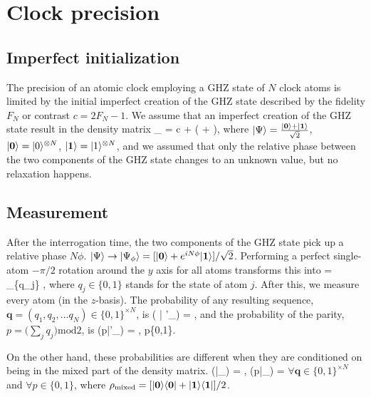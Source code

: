 \section{Clock precision}
\label{app:clock_precision}

\subsection{Imperfect initialization}
The precision of an atomic clock employing a GHZ state of $N$ clock atoms is
limited by the initial imperfect creation of the GHZ state
described by the fidelity $F_N$ or contrast $c = 2F_N -1$.
We assume that an imperfect creation of the GHZ state result in the density
matrix 
\bel
	\rho_ = c \ket{\Psi}
	\bra{\Psi}
	 + \big(
	 +  \big),
\eel
where $| \Psi \rangle = \frac{| \mathbf{0} \rangle + | \mathbf{1} \rangle
}{\sqrt{2}}$, $| \mathbf{0} \rangle = | 0 \rangle^{\otimes N}$, $| \mathbf{1} \rangle =
| 1 \rangle^{\otimes N}$, and we assumed that only the relative phase between the
two components of the GHZ state changes to an unknown value,  but no
relaxation happens.

\subsection{Measurement}
After the interrogation time, the two components of the GHZ state pick up a
relative phase $N\phi$. $| \Psi \rangle\rightarrow | \Psi_\phi \rangle =
[| \mathbf{0} \rangle + e^{iN\phi}| \mathbf{1} \rangle]/\sqrt{2}$. Performing a perfect
single-atom $-\pi/2$ rotation around the $y$ axis for all atoms transforms this
into
\bel
	 = \sum_{\{q_j\}}  ,
\eel
where $q_j\in\{0,1\}$ stands for the state of atom $j$. After this, we 
measure every atom (in the $z$-basis). The probability of any resulting
sequence, $\mathbf{q} = (q_1, q_2, \dots q_N) \in \{0,1\}^{\times N}$, is
\bel
	\PP( | \Psi'_\phi) =  ,
\eel
and the probability of the parity, $p = \big(\sum_j q_j\big)\mathrm{ mod } 2$, is
\bel
	\PP(p|\Psi'_\phi) = , \qquad p\in\{0,1\}.
\eel

On the other hand, these probabilities are different when they are conditioned
on being in the mixed part of the density matrix.
\bel
	\PP(|\rho_) = , \qquad
	\PP(p|\rho_) = 
\eel
$\forall \mathbf{q}\in\{0,1\}^{\times N}$ and $\forall p\in\{0,1\}$, where
$\rho_\mathrm{mixed} = [| \mathbf{0} \rangle\langle \mathbf{0} | +
| \mathbf{1} \rangle\langle \mathbf{1} |]/2$.

